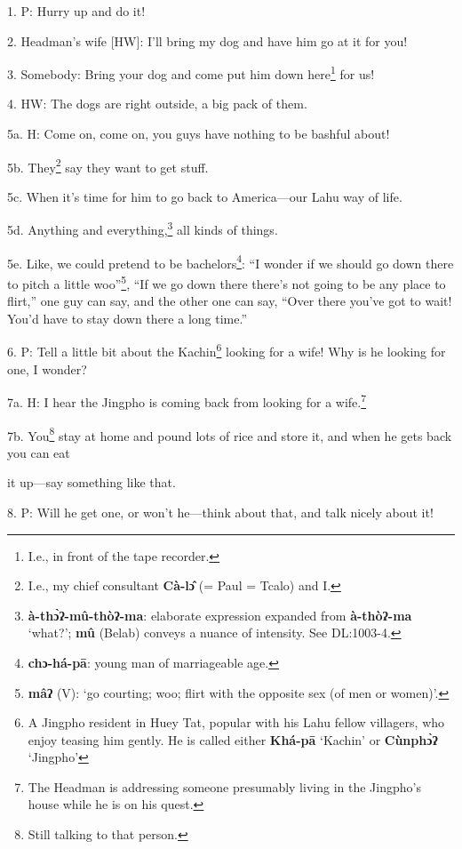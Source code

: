 \setcounter{footnote}{0}

1. P: Hurry up and do it!

2. Headman's wife [HW]: I'll bring my dog and have him go at it for you!

3. Somebody: Bring your dog and come put him down here\footnote{I.e., in front of the tape recorder.} for us!

4. HW: The dogs are right outside, a big pack of them.

5a. H: Come on, come on, you guys have nothing to be bashful about!

5b. They\footnote{I.e., my chief consultant \textbf{Cà-lɔ̂} (= Paul = Tcalo) and I.} say they want to get stuff.

5c. When it's time for him to go back to America---our Lahu way of life.

5d. Anything and everything,\footnote{\textbf{à-thɔ̀ʔ-mû-thòʔ-ma}: elaborate expression expanded from \textbf{à-thòʔ-ma} `what?'; \textbf{mû} (Belab) conveys a nuance of intensity. See DL:1003-4.} all kinds of things.

5e. Like, we could pretend to be bachelors\footnote{\textbf{chɔ-há-pā}: young man of marriageable age.}: ``I wonder if we should go down
there to pitch a little woo''\footnote{\textbf{mâʔ} (V): `go courting; woo; flirt with the opposite sex (of men or women)'.}, ``If we go down there there's not going
to be any place to flirt,'' one guy can say, and the other one can say, ``Over
there you've got to wait! You'd have to stay down there a long time.''

6. P: Tell a little bit about the Kachin\footnote{A Jingpho resident in Huey Tat, popular with his Lahu fellow villagers, who enjoy teasing him gently. He is called either \textbf{Khá-pā} `Kachin' or \textbf{Cùnphɔ̀ʔ }`Jingpho'} looking for a wife! Why is he looking
for one, I wonder?


7a. H: I hear the Jingpho is coming back from looking for a wife.\footnote{The Headman is addressing someone presumably living in the Jingpho's house while he is on his quest.}

7b. You\footnote{Still talking to that person.} stay at home and pound lots of rice and store it, and when he gets
back you can eat

it up---say something like that.

8. P: Will he get one, or won't he---think about that, and talk nicely about it!


